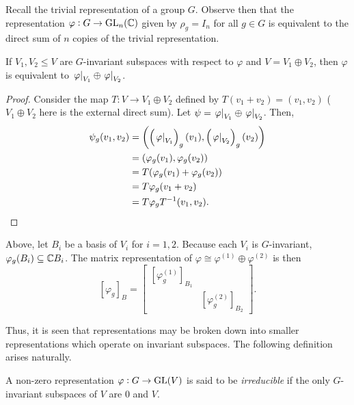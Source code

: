 			Recall the trivial representation of a group $G$. Observe then that the representation $\varphi : G \to \operatorname{GL}_n(\mathbb{C})$ given by $\rho_g = I_n$ for all $g \in G$ is equivalent to the direct sum of $n$ copies of the trivial representation.

			\begin{fprop}
				\label{prop: decomposability direct sum invariant}
				If $V_1,V_2 \le V$ are $G$-invariant subspaces with respect to $\varphi$ and $V = V_1 \oplus V_2$, then $\varphi$ is equivalent to $\left.\varphi\right|_{V_1} \oplus \left.\varphi\right|_{V_2}$.
			\end{fprop}
			\begin{proof}
				Consider the map $T : V \to V_1 \oplus V_2$ defined by $T(v_1+v_2) = (v_1,v_2)$ ($V_1 \oplus V_2$ here is the external direct sum). Let $\psi = \left.\varphi\right|_{V_1} \oplus \left.\varphi\right|_{V_2}$. Then,
				\begin{align*}
					\psi_g(v_1,v_2) &= \left( \left(\left.\varphi\right|_{V_1}\right)_g(v_1) , \left(\left.\varphi\right|_{V_2}\right)_g(v_2) \right) \\
						&= (\varphi_g(v_1), \varphi_g(v_2)) \\
						&= T(\varphi_g(v_1) + \varphi_g(v_2)) \\
						&= T\varphi_g(v_1+v_2) \\
						&= T\varphi_gT^{-1}(v_1,v_2). \qedhere
				\end{align*}
			\end{proof}

			Above, let $B_i$ be a basis of $V_i$ for $i = 1,2$. Because each $V_i$ is $G$-invariant, $\varphi_g(B_i) \subseteq \mathbb{C} B_i$. The matrix representation of $\varphi \cong \varphi^{(1)} \oplus \varphi^{(2)}$ is then
			\[ [\varphi_g]_B = \begin{bmatrix} \left[\varphi^{(1)}_g\right]_{B_1} & \\ & \left[\varphi^{(2)}_g\right]_{B_2} \end{bmatrix}. \]

			Thus, it is seen that representations may be broken down into smaller representations which operate on invariant subspaces. The following definition arises naturally.

			\begin{fdef}
				A non-zero representation $\varphi : G \to \operatorname{GL}(V)$ is said to be \emph{irreducible} if the only $G$-invariant subspaces of $V$ are $0$ and $V$.
			\end{fdef}

